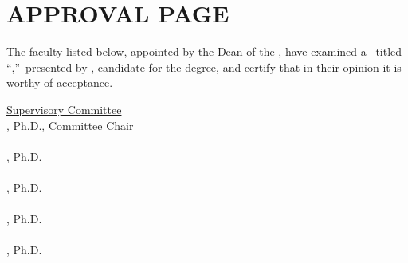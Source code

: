 \newpage
\section*{\MakeUppercase{Approval Page}}

\setlength{\baselineskip}{24pt}
The faculty listed below, appointed by the Dean of the \MyUMKCSchool,
 have examined a \MakeLowercase{\ThesisOrDissertation}\ titled
``\MyThesisTitle,''~presented by \MyName, candidate
for the \MyDegree degree, and  certify that in
their opinion it is worthy of acceptance.

\vspace{0.5in}
\setlength{\baselineskip}{5pt}

\begin{center}
\underline{Supervisory Committee} \\

\vspace{0.25in}
\MyChair, Ph.D., Committee Chair \\
\MyChairDept \\

\vspace{0.25in}
\MyComOne, Ph.D.\\
\MyComOneD \\

\vspace{0.25in}
\MyComTwo, Ph.D.\\
\MyComTwoD \\

\vspace{0.25in}
\MyComThree, Ph.D.\\
\MyComThreeD \\

\vspace{0.25in}
\MyComFour, Ph.D.\\
\MyComFourD \\

\end{center} \doublespacing 